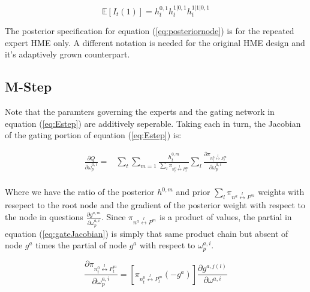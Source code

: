 \documentclass[12pt]{article}
\begin{document}
\begin{equation} \label{eq:posteriorrelation}
  \mathbb{E}\left[I_{t}(1)\right] = h^{0,1}_{t} h^{1|0,1}_{t} h^{1|1|0,1}_{t}
\end{equation}

The posterior specification for equation (\ref{eq:posteriornode}) is for the
repeated expert HME only. A different notation is needed for the original HME
design and it's adaptively grown counterpart.

\subsection{M-Step}

Note that the paramters governing the experts and the gating network in
equation (\ref{eq:Estep}) are additively seperable. Taking each in turn, the
Jacobian of the gating portion of equation (\ref{eq:Estep}) is:

\begin{equation} \label{eq:gateJacobian}
  \begin{split}
    \frac{\partial Q}{\partial \omega^{a,i}_{p}} =& \sum_{t} \sum_{m=1}  \frac{h^{0,m}_{t}}{\sum_{l} \pi_{n^{0}_{t} \overset{l}{\longleftrightarrow} P^{m}_{t}}} \sum_{l} \frac{\partial \pi_{n^{0}_{t} \overset{l}{\longleftrightarrow} P^{m}_{t}}}{\partial \omega^{a,i}_{p}} \\
  \end{split}
\end{equation}

Where we have the ratio of the posterior $h^{0,m}$ and prior 
$\sum_{l} \pi_{n^{a} \overset{l}{\longleftrightarrow} P^{m}}$ weights with resepect
to the root node and the gradient of the posterior weight with respect to the node
in questions $\frac{\partial g^{a,m}}{\partial \omega^{a,i}_{p}}$. Since
$\pi_{n^{a} \overset{l}{\longleftrightarrow} P^{m}}$ is a product of values, the
partial in equation (\ref{eq:gateJacobian}) is simply that same product chain but
absent of node $g^a$ times the partial of node $g^a$ with respect to
$\omega^{a,i}_{p}$.

\begin{equation} \label{eq:gatechainpartial}
  \frac{\partial \pi_{n^{0}_{t} \overset{l}{\longleftrightarrow} P^{m}_{t}}}{\partial \omega^{a,i}_{p}} = [\pi_{n^{0}_{t} \overset{l}{\longleftrightarrow} P^{m}_{t}} (-g^{a})] \frac{\partial g^{a, j(l)}}{\partial \omega^{a, i}}
\end{equation}
\end{document}
